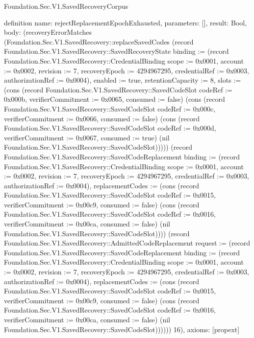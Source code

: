 \begin{lexlean}{Foundation.Sec.V1.SavedRecoveryCorpus}
\begin{semanticmodule}
definition{
  name: rejectReplacementEpochExhausted,
  parameters: [],
  result: Bool,
  body: (recoveryErrorMatches (Foundation.Sec.V1.SavedRecovery::replaceSavedCodes (record Foundation.Sec.V1.SavedRecovery::SavedRecoveryState {binding := (record Foundation.Sec.V1.SavedRecovery::CredentialBinding {scope := 0x0001, account := 0x0002, revision := 7, recoveryEpoch := 4294967295, credentialRef := 0x0003, authorizationRef := 0x0004}), enabled := true, retentionCapacity := 8, slots := (cons (record Foundation.Sec.V1.SavedRecovery::SavedCodeSlot {codeRef := 0x000b, verifierCommitment := 0x0065, consumed := false}) (cons (record Foundation.Sec.V1.SavedRecovery::SavedCodeSlot {codeRef := 0x000c, verifierCommitment := 0x0066, consumed := false}) (cons (record Foundation.Sec.V1.SavedRecovery::SavedCodeSlot {codeRef := 0x000d, verifierCommitment := 0x0067, consumed := true}) (nil Foundation.Sec.V1.SavedRecovery::SavedCodeSlot))))}) (record Foundation.Sec.V1.SavedRecovery::SavedCodeReplacement {binding := (record Foundation.Sec.V1.SavedRecovery::CredentialBinding {scope := 0x0001, account := 0x0002, revision := 7, recoveryEpoch := 4294967295, credentialRef := 0x0003, authorizationRef := 0x0004}), replacementCodes := (cons (record Foundation.Sec.V1.SavedRecovery::SavedCodeSlot {codeRef := 0x0015, verifierCommitment := 0x00c9, consumed := false}) (cons (record Foundation.Sec.V1.SavedRecovery::SavedCodeSlot {codeRef := 0x0016, verifierCommitment := 0x00ca, consumed := false}) (nil Foundation.Sec.V1.SavedRecovery::SavedCodeSlot)))}) (record Foundation.Sec.V1.SavedRecovery::AdmittedCodeReplacement {request := (record Foundation.Sec.V1.SavedRecovery::SavedCodeReplacement {binding := (record Foundation.Sec.V1.SavedRecovery::CredentialBinding {scope := 0x0001, account := 0x0002, revision := 7, recoveryEpoch := 4294967295, credentialRef := 0x0003, authorizationRef := 0x0004}), replacementCodes := (cons (record Foundation.Sec.V1.SavedRecovery::SavedCodeSlot {codeRef := 0x0015, verifierCommitment := 0x00c9, consumed := false}) (cons (record Foundation.Sec.V1.SavedRecovery::SavedCodeSlot {codeRef := 0x0016, verifierCommitment := 0x00ca, consumed := false}) (nil Foundation.Sec.V1.SavedRecovery::SavedCodeSlot)))})})) 16),
  axioms: [propext]
}


\end{semanticmodule}
\end{lexlean}
